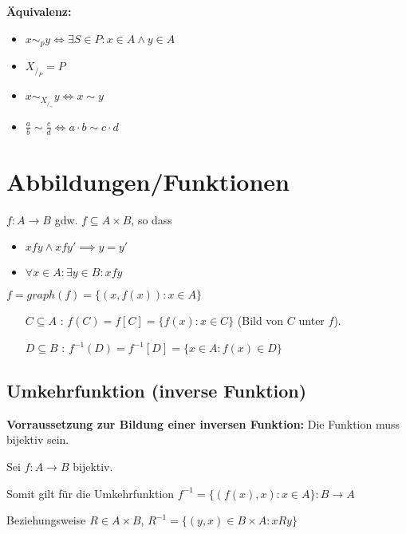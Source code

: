 \documentclass[12pt]{scrreprt}
\begin{document}
                \textbf{Äquivalenz:}
                \begin{itemize}
                    \item $ x \sim _ p y \iff \exists S \in P : x \in A \land y \in A $
                    \item $ X _ { / _ { P } } = P $
                    \item $ x \sim _ { X _ { / _ { \sim } } } y \iff x \sim y $
                    \item $ \frac{a}{b} \sim \frac{c}{d} \iff a \cdot b \sim c \cdot d $
                \end{itemize}


        \section{Abbildungen/Funktionen}
            $ f : A \rightarrow B $ gdw. $ f \subseteq A \times B $, so dass
            \begin{itemize}
                \item $ xfy \land xfy' \implies y = y' $
                \item $ \forall x \in A : \exists y \in B : xfy $
            \end{itemize}

            $ f = graph(f) = \{ (x, f(x)) : x \in A \} $

            \begin{itemize}
                \item[$ C \subseteq A $] : $ f(C) = f[C] = \{ f(x) : x \in C \} $ (Bild von $ C $ unter $ f $).
                \item[$ D \subseteq B $] : $ f ^ { -1 } (D) = f ^ { -1 } [D] = \{ x \in A : f(x) \in D \} $
            \end{itemize}

            \subsection{Umkehrfunktion (inverse Funktion)}
                \textbf{Vorraussetzung zur Bildung einer inversen Funktion:} Die Funktion muss bijektiv sein.

                Sei $ f : A \rightarrow B $ bijektiv.

                Somit gilt für die Umkehrfunktion $ f ^ { -1 } = \{ (f(x), x) : x \in A \} : B \rightarrow A $

                Beziehungsweise $ R \in A \times B $, $ R ^ { -1 } = \{ (y, x) \in B \times A : xRy \} $
\end{document}
